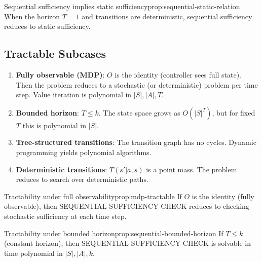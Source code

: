 
\begin{claim}{Sequential sufficiency implies static sufficiency}{prop:sequential-static-relation}
When the horizon $T = 1$ and transitions are deterministic, sequential sufficiency reduces to static sufficiency.
\end{claim}


\subsection{Tractable Subcases}

\begin{enumerate}
\item \textbf{Fully observable (MDP)}: $O$ is the identity (controller sees full state). Then the problem reduces to a stochastic (or deterministic) problem per time step. Value iteration is polynomial in $|S|, |A|, T$.

\item \textbf{Bounded horizon}: $T \leq k$. The state space grows as $O(|S|^T)$, but for fixed $T$ this is polynomial in $|S|$.

\item \textbf{Tree-structured transitions}: The transition graph has no cycles. Dynamic programming yields polynomial algorithms.

\item \textbf{Deterministic transitions}: $T(s'|a,s)$ is a point mass. The problem reduces to search over deterministic paths.
\end{enumerate}

\begin{claim}{Tractability under full observability}{prop:mdp-tractable}
If $O$ is the identity (fully observable), then SEQUENTIAL-SUFFICIENCY-CHECK reduces to checking stochastic sufficiency at each time step.
\end{claim}


\begin{claim}{Tractability under bounded horizon}{prop:sequential-bounded-horizon}
If $T \leq k$ (constant horizon), then SEQUENTIAL-SUFFICIENCY-CHECK is solvable in time polynomial in $|S|, |A|, k$.
\end{claim}

